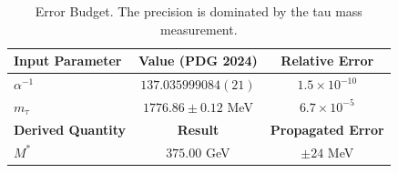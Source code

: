 \begin{table}[H]
\centering
\begin{tabular}{l c c}
\toprule
\textbf{Input Parameter} & \textbf{Value (PDG 2024)} & \textbf{Relative Error} \\
\midrule
$\alpha^{-1}$ & $137.035999084(21)$ & $1.5 \times 10^{-10}$ \\
$m_\tau$ & $1776.86 \pm 0.12$ MeV & $6.7 \times 10^{-5}$ \\
\midrule
\textbf{Derived Quantity} & \textbf{Result} & \textbf{Propagated Error} \\
\midrule
$M^*$ & $375.00$ GeV & $\pm 24$ MeV \\
\bottomrule
\end{tabular}
\caption{Error Budget. The precision is dominated by the tau mass measurement.}
\end{table}
